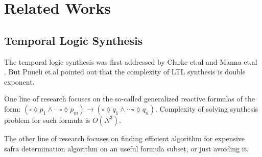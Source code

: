 \documentclass[journal]{IEEEtran}
\begin{document}
\section{Related Works}\label{sec_relwork}
%
%
\subsection{Temporal Logic Synthesis}

The temporal logic synthesis was first addressed by Clarke et.al\cite{DSGSYNTMPLG} and Manna et.al \cite{SYNTMPLGSPC}.
But Pnueli et.al \cite{SYNRCTVMD} pointed out that the complexity of LTL synthesis is double exponent.

One line of research \cite{CNTLSYNTMDAUTO,DTMGENGMELTL,SYNRCTVDES} focuses on the so-called generalized reactive formulas of the form:
$(\square \lozenge p_1 \wedge \cdots \square \lozenge p_m) \to (\square \lozenge q_1 \wedge \cdots \square \lozenge q_n)$.
Complexity of solving synthesis problem for such formula is $O(N^3)$.

The other line of research focuses on finding efficient algorithm \cite{SYNCNTLBNDRPN}
for expensive safra determination algorithm \cite{CMPLXAUTO} on an useful formula subset,
or just avoiding it\cite{NEWALGSTRGSYN}.

\end{document}
